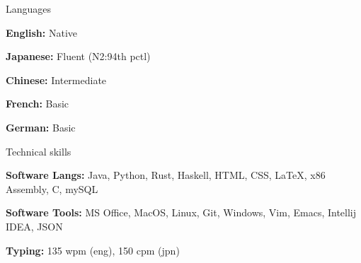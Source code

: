 \documentclass[10pt]{resume} %
\begin{document}
\begin{multicols}{3}


\begin{rSection}{Languages}
	\item \textbf{English:} Native
	\item \textbf{Japanese:} Fluent (N2:94th pctl)
	\item \textbf{Chinese:} Intermediate
	\item \textbf{French:} Basic
	\item \textbf{German:} Basic
\end{rSection}


\begin{rSection}{Technical skills}
    \item \textbf{Software Langs:}
        Java,
        Python,
        Rust,
        Haskell,
        HTML,
        CSS,
        \LaTeX,
        x86 Assembly,
        C,
        mySQL
    \item \textbf{Software Tools:}
        MS Office,
        MacOS,
        Linux,
        Git,
        Windows,
        Vim,
        Emacs,
        Intellij IDEA,
        JSON
    \item \textbf{Typing:} 135 wpm (eng), 150 cpm (jpn)
\end{rSection}

\end{multicols}

\end{document}
